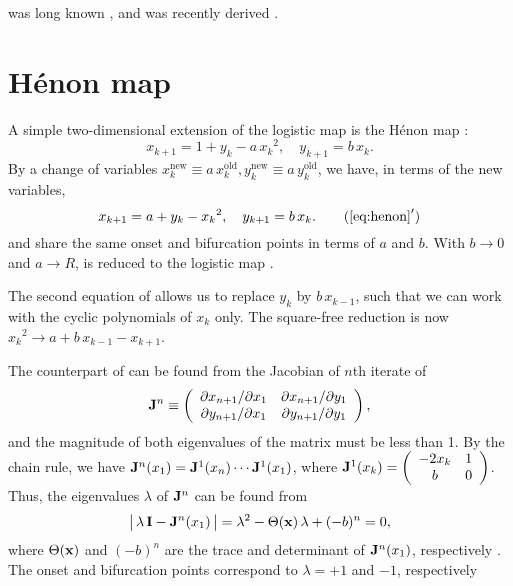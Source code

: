 \documentclass[twocolumn]{revtex4-1}
\begin{document}
 was long known \cite{mira},
and  was recently derived \cite{blackhurst}.




\section{\label{sec:henon}H\'enon map}





A simple two-dimensional extension of the logistic map
  is the H\'enon map \cite{henon}:
\begin{equation}
  x_{k+1} = 1 + y_k - a \, {x_k}^2, \quad
  y_{k+1} = b \, x_k.
\label{eq:henon}
\end{equation}
%
By a change of variables \cite{huang}
  $x_k^\mathrm{new} \equiv a \, x_k^\mathrm{old},
   y_k^\mathrm{new} \equiv a \, y_k^\mathrm{old}$,
we have, in terms of the new variables,
\begin{equation}
  x_{k+1} = a + y_k - {x_k}^2, \quad
  y_{k+1} = b \, x_k.
\tag{$\ref{eq:henon}'$}
\label{eq:henons}
\end{equation}
%
 and  share the
same onset and bifurcation points
in terms of $a$ and $b$.
%
With $b \rightarrow 0$ and $a \rightarrow R$,
 is reduced to the logistic map .


The second equation of 
allows us to replace $y_k$ by $b \, x_{k-1}$,
  such that we can work with the cyclic polynomials of $x_k$ only.
The square-free reduction is now
  ${x_k}^2 \rightarrow a + b \, x_{k-1} - x_{k+1}$.



The counterpart of 
  can be found from the Jacobian of $n$th iterate of 
\[
  \mathbf{J}^n
  \equiv
  \left(
    \begin{array}{ccc}
      \partial x_{n+1}/\partial x_1 & \partial x_{n+1}/\partial y_1 \\
      \partial y_{n+1}/\partial x_1 & \partial y_{n+1}/\partial y_1 \\
    \end{array}
  \right),
\]
and the magnitude of both eigenvalues of the matrix must be less than 1.
By the chain rule, we have
  $\mathbf{J}^n (x_1) = \mathbf{J}^1(x_n) \cdots \mathbf{J}^1(x_1)$,
  where
$\mathbf{J}^1(x_k)
  =
  \left(
    \begin{array}{cc}
      -2 x_k & 1 \\
      b & 0
    \end{array}
  \right)$.
Thus, the eigenvalues $\lambda$ of $\mathbf{J}^n$ can be found from
%
\begin{equation}
\big|\, \lambda \, \mathbf{I} - \mathbf{J}^n(x_1) \,\big|
  = \lambda^2 - \Theta(\mathbf{x}) \,\lambda +(-b)^n = 0,
\label{eq:henonder}
\end{equation}
%
where $\Theta(\mathbf{x})$ and $(-b)^n$
  are the trace and determinant of $\mathbf{J}^n(x_1)$,
  respectively \cite{huang, hitzl}.
The onset and bifurcation points
  correspond to $\lambda = +1$ and $-1$, respectively
\end{document}
